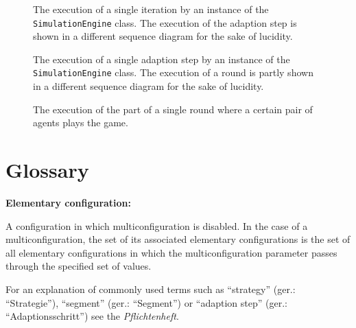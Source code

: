 \documentclass[parskip=full,11pt]{scrartcl}
\begin{document}
\iftrue
\begin{figure}[h]
	\centering
	\fontsize{3.25}{8}\selectfont
	
	\caption{The execution of a single iteration by an instance of the \texttt{SimulationEngine} class. The execution of the adaption step is shown in a different sequence diagram for the sake of lucidity.}
\end{figure}
\begin{figure}[h]
	\centering
	\fontsize{3.5}{8}\selectfont
	
	\caption{The execution of a single adaption step by an instance of the \texttt{SimulationEngine} class. The execution of a round is partly shown in a different sequence diagram for the sake of lucidity.}
\end{figure}
\begin{figure}[h]
	\centering
	\fontsize{3.75}{8}\selectfont
	
	\caption{The execution of the part of a single round where a certain pair of agents plays the game.}
\end{figure}
\fi
\section{Glossary}
\textbf{Elementary configuration:}

A configuration in which multiconfiguration is disabled. In the case of a multiconfiguration, the set of its associated elementary configurations is the set of all elementary configurations in which the multiconfiguration parameter passes through the specified set of values.

For an explanation of commonly used terms such as \enquote{strategy} (ger.: \enquote{Strategie}), \enquote{segment} (ger.: \enquote{Segment}) or \enquote{adaption step} (ger.: \enquote{Adaptionsschritt}) see the \textit{Pflichtenheft}.
\end{document}
